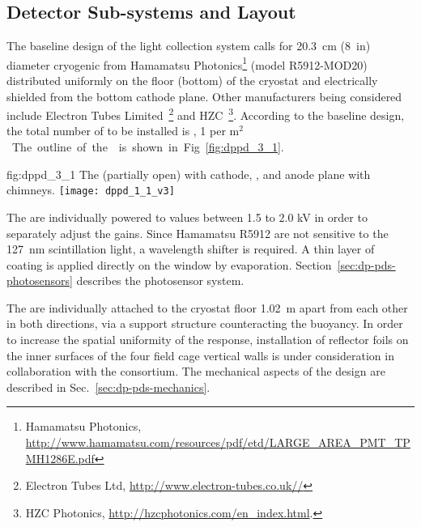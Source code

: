 \subsection{Detector Sub-systems and Layout}
\label{sec:dp-pds-overview_layout}

The baseline design of the light collection system calls for \SI{20.3}{cm} (\SI{8}{in}) diameter cryogenic  from Hamamatsu Photonics\footnote{Hamamatsu Photonics\texttrademark{}, \url{http://www.hamamatsu.com/resources/pdf/etd/LARGE_AREA_PMT_TPMH1286E.pdf}} (model R5912-MOD20) distributed uniformly on the floor (bottom) of the cryostat and electrically shielded from the bottom cathode plane. Other  manufacturers being considered include Electron Tubes Limited~\footnote{Electron Tubes Ltd\texttrademark{}, \url{http://www.electron-tubes.co.uk//}} and HZC~\footnote{HZC Photonics\texttrademark{}, \url{http://hzcphotonics.com/en_index.html}.}. According to the baseline design, the total number of  to be installed is \dpnumpmtch, \num{1} per \si{m$^2$}. The outline of the  is shown in Fig.~\ref{fig:dppd_3_1}.

\begin{dunefigure}{fig:dppd_3_1}
{The  (partially open) with cathode, ,  and anode plane with chimneys.}
\texttt{[image: dppd\_1\_1\_v3]}
\end{dunefigure}

The  are individually powered to values between \num{1.5} to \num{2.0} \si{\kV} in order to separately adjust the  gains. Since Hamamatsu R5912  are not sensitive to the \SI{127}{nm} scintillation light, a wavelength shifter is required. A thin layer of ~\cite{tpb} coating is applied directly on the  window by evaporation. Section~\ref{sec:dp-pds-photosensors} describes the photosensor system.

The  are individually attached to the cryostat floor \SI{1.02}{m} apart from each other in both directions, via a  support structure counteracting the  buoyancy. In order to increase the spatial uniformity of the  response, installation of  reflector foils on the inner surfaces of the four field cage vertical walls is under consideration in collaboration with the  consortium. The mechanical aspects of the  design are described in Sec.~\ref{sec:dp-pds-mechanics}.


